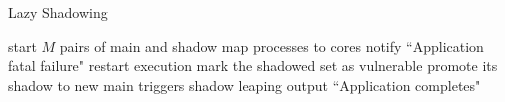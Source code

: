 \begin{algorithm}[t]
  \caption{Lazy Shadowing}
  \BlankLine
  start $M$ pairs of main and shadow\;
  map processes to cores\;
    {
        {
            {
                notify ``Application fatal failure"\;
                restart execution\; %
            }
            {
                mark the shadowed set as vulnerable\;
                {
                    promote its shadow to new main\;
                    triggers shadow leaping\; %
                }
            }
        }  
    }
    output ``Application completes"\;
  \label{al:ls}
\end{algorithm}

